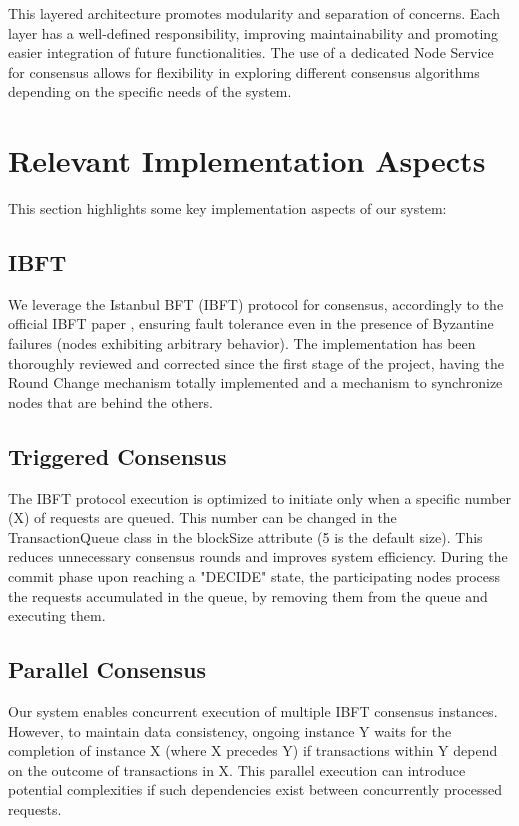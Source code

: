 This layered architecture promotes modularity and separation of concerns. Each layer has a well-defined responsibility, improving maintainability and promoting easier integration of future functionalities. The use of a dedicated Node Service for consensus allows for flexibility in exploring different consensus algorithms depending on the specific needs of the system.

\section{Relevant Implementation Aspects}

This section highlights some key implementation aspects of our system:

\subsection{IBFT}
We leverage the Istanbul BFT (IBFT) protocol for consensus, accordingly to the official IBFT paper \cite{ibft-paper}, ensuring fault tolerance even in the presence of Byzantine failures (nodes exhibiting arbitrary behavior). The implementation has been thoroughly reviewed and corrected since the first stage of the project, having the Round Change mechanism totally implemented and a mechanism to synchronize nodes that are behind the others.

\subsection{Triggered Consensus}
The IBFT protocol execution is optimized to initiate only when a specific number (X) of requests are queued. This number can be changed in the TransactionQueue class in the blockSize attribute (5 is the default size). This reduces unnecessary consensus rounds and improves system efficiency. During the commit phase upon reaching a "DECIDE" state, the participating nodes process the requests accumulated in the queue, by removing them from the queue and executing them.

\subsection{Parallel Consensus}
Our system enables concurrent execution of multiple IBFT consensus instances. However, to maintain data consistency, ongoing instance Y waits for the completion of instance X (where X precedes Y) if transactions within Y depend on the outcome of transactions in X. This parallel execution can introduce potential complexities if such dependencies exist between concurrently processed requests. 

